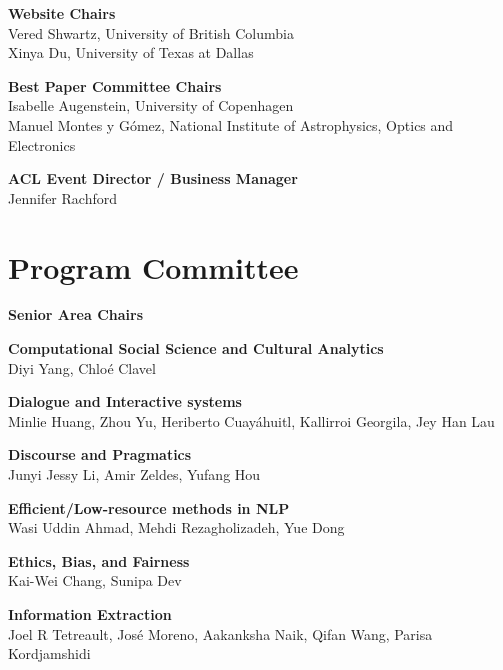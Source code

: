 {\bf Website Chairs} \\
\hspace*{0.2in} Vered Shwartz, University of British Columbia \\
\hspace*{0.2in} Xinya Du, University of Texas at Dallas

{\bf Best Paper Committee Chairs} \\
\hspace*{0.2in} Isabelle Augenstein, University of Copenhagen \\
\hspace*{0.2in} Manuel Montes y G\'omez, National Institute of Astrophysics, Optics and Electronics

{\bf ACL Event Director / Business Manager} \\
\hspace*{0.2in} Jennifer Rachford


\clearpage
\section{Program Committee}
\setlength{\parindent}{0pt}

{\bf\large Senior Area Chairs}
\vspace{0.1in}

\textbf{Computational Social Science and Cultural Analytics} \\
\hspace*{0.2in} Diyi Yang, Chlo\'e Clavel

\textbf{Dialogue and Interactive systems} \\
\hspace*{0.2in} Minlie Huang, Zhou Yu, Heriberto Cuayáhuitl, Kallirroi Georgila, Jey Han Lau

\textbf{Discourse and Pragmatics} \\
\hspace*{0.2in} Junyi Jessy Li, Amir Zeldes, Yufang Hou

\textbf{Efficient/Low-resource methods in NLP} \\
\hspace*{0.2in} Wasi Uddin Ahmad, Mehdi Rezagholizadeh, Yue Dong

\textbf{Ethics, Bias, and Fairness} \\
\hspace*{0.2in} Kai-Wei Chang, Sunipa Dev

\textbf{Information Extraction} \\
\hspace*{0.2in} Joel R Tetreault, Jos\'e Moreno, Aakanksha Naik, Qifan Wang, Parisa Kordjamshidi

